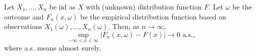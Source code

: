 \documentclass[12pt]{article}
\begin{document}
Let $X_1,\ldots,X_n$ be iid as $X$ with (unknown) distribution function $F$.  Let $\omega$ be the outcome and $F_n(x,\omega)$ be the empirical distribution function based on observations $X_1(\omega),\ldots,X_n(\omega)$.  Then, as $n\rightarrow\infty$,
$$\sup_{-\infty<x<\infty}|F_n(x,\omega)-F(x)|\rightarrow 0\mbox{ a.s.},$$
where a.s. means almost surely.
\end{document}
